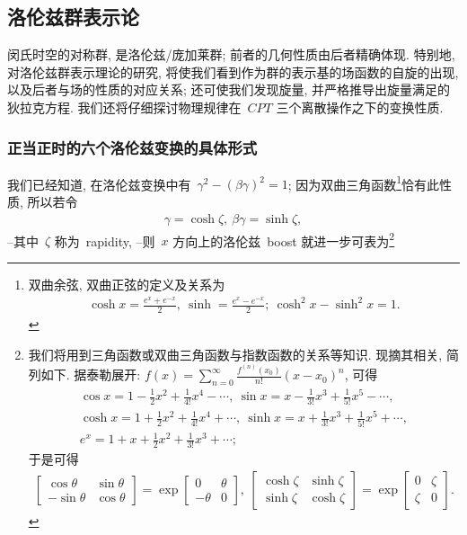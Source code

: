 \subsection{洛伦兹群表示论}%

闵氏时空的对称群, 是洛伦兹/庞加莱群; 前者的几何性质由后者精确体现. 特别地, 对洛伦兹群表示理论的研究, 将使我们看到作为群的表示基的场函数的自旋的出现, 以及后者与场的性质的对应关系; 还可使我们发现旋量, 并严格推导出旋量满足的狄拉克方程. 我们还将仔细探讨物理规律在~$CPT$ 三个离散操作之下的变换性质.

\subsubsection{正当正时的六个洛伦兹变换的具体形式}
我们已经知道, 在洛伦兹变换中有~$\gamma^2-(\beta\gamma)^2=1$; 因为双曲三角函数\footnote{双曲余弦, 双曲正弦的定义及关系为
\begin{align}
\cosh x=\frac{e^x+e^{-x}}{2},~\sinh=\frac{e^x-e^{-x}}{2};~\cosh^2x-\sinh^2x=1.
\end{align}}恰有此性质, 所以若令
\begin{align}
\gamma=\cosh\zeta,~\beta\gamma=\sinh\zeta,
\end{align}
--其中~$\zeta$ 称为~rapidity, --则~$x$ 方向上的洛伦兹~boost 就进一步可表为\footnote{我们将用到三角函数或双曲三角函数与指数函数的关系等知识. 现摘其相关, 简列如下. 据泰勒展开: $f(x)=\sum_{n=0}^\infty\frac{f^{(n)}(x_0)}{n!}(x-x_0)^n$, 可得
\begin{gather}
\cos x=1-\frac{1}{2}x^2+\frac{1}{4!}x^4-\cdots,~\sin x=x-\frac{1}{3!}x^3+\frac{1}{5!}x^5-\cdots,\\
\cosh x=1+\frac{1}{2}x^2+\frac{1}{4!}x^4+\cdots,~\sinh x=x+\frac{1}{3!}x^3+\frac{1}{5!}x^5+\cdots,\\
e^x=1+x+\frac{1}{2}x^2+\frac{1}{3!}x^3+\cdots;%
\end{gather}
于是可得
\begin{gather}
\left[
\begin{array}{cc}
\cos\theta&\sin\theta\\
-\sin\theta&\cos\theta
\end{array}
\right]=
\exp
\left[
\begin{array}{cc}
0&\theta\\
-\theta&0
\end{array}
\right],~
\left[
\begin{array}{cc}
\cosh\zeta&\sinh\zeta\\
\sinh\zeta&\cosh\zeta
\end{array}
\right]=
\exp
\left[
\begin{array}{cc}
0&\zeta\\
\zeta&0
\end{array}
\right].
\end{gather}
}
